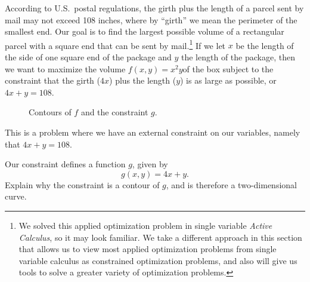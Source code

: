 \begin{pa} \label{PA:10.8}  According to U.S.~postal regulations, the girth plus the length of a parcel sent by mail may not exceed 108 inches, where by ``girth'' we mean the perimeter of the smallest end. Our goal is to find the largest possible volume of a rectangular parcel with a square end that can be sent by mail.\footnote{We solved this applied optimization problem in single variable \emph{Active Calculus}, so it may look familiar. We take a different approach in this section that allows us to view most applied optimization problems from single variable calculus as constrained optimization problems, and also will give us tools to solve a greater variety of optimization problems.} If we let $x$ be the length of the side of one square end of the package and $y$ the length of the package, then we want to maximize the volume $f(x,y) = x^2y$of the box subject to the constraint that the girth ($4x$) plus the length ($y$) is as large as possible, or $4x+y = 108$. 
  \begin{figure}[ht]
  \begin{center}
  \end{center}
  \caption{Contours of $f$ and the constraint $g$.}
  \label{F:10.8.preview}
  \end{figure}

This is a problem where we have an external constraint on our variables, namely that  $4x + y = 108$. 
    \ba
    \item Our constraint defines a function $g$, given by
    \[g(x,y) = 4x+y.\]
    Explain why the constraint is a contour of $g$, and is therefore a two-dimensional curve.


\end{pa}
